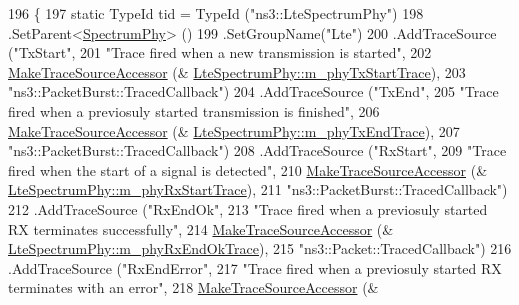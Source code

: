 \begin{DoxyCode}
196 \{
197   \textcolor{keyword}{static} TypeId tid = TypeId (\textcolor{stringliteral}{"ns3::LteSpectrumPhy"})
198     .SetParent<\hyperlink{classns3_1_1SpectrumPhy_a207bd7373a9fd3b7f8d8e00380a0e7e4}{SpectrumPhy}> ()
199     .SetGroupName(\textcolor{stringliteral}{"Lte"})
200     .AddTraceSource (\textcolor{stringliteral}{"TxStart"},
201                      \textcolor{stringliteral}{"Trace fired when a new transmission is started"},
202                      \hyperlink{group__tracing_gab21a770b9855af4e8f69f7531ea4a6b0}{MakeTraceSourceAccessor} (&
      \hyperlink{classns3_1_1LteSpectrumPhy_a51240ee46496b84e08f0e8101c74fcfc}{LteSpectrumPhy::m\_phyTxStartTrace}),
203                      \textcolor{stringliteral}{"ns3::PacketBurst::TracedCallback"})
204     .AddTraceSource (\textcolor{stringliteral}{"TxEnd"},
205                      \textcolor{stringliteral}{"Trace fired when a previosuly started transmission is finished"},
206                      \hyperlink{group__tracing_gab21a770b9855af4e8f69f7531ea4a6b0}{MakeTraceSourceAccessor} (&
      \hyperlink{classns3_1_1LteSpectrumPhy_a0c6aa04be77ea12d62acc1c71dcd2658}{LteSpectrumPhy::m\_phyTxEndTrace}),
207                      \textcolor{stringliteral}{"ns3::PacketBurst::TracedCallback"})
208     .AddTraceSource (\textcolor{stringliteral}{"RxStart"},
209                      \textcolor{stringliteral}{"Trace fired when the start of a signal is detected"},
210                      \hyperlink{group__tracing_gab21a770b9855af4e8f69f7531ea4a6b0}{MakeTraceSourceAccessor} (&
      \hyperlink{classns3_1_1LteSpectrumPhy_a78dd3511fa6cb1facf9d6ce1b0d1b5a1}{LteSpectrumPhy::m\_phyRxStartTrace}),
211                      \textcolor{stringliteral}{"ns3::PacketBurst::TracedCallback"})
212     .AddTraceSource (\textcolor{stringliteral}{"RxEndOk"},
213                      \textcolor{stringliteral}{"Trace fired when a previosuly started RX terminates successfully"},
214                      \hyperlink{group__tracing_gab21a770b9855af4e8f69f7531ea4a6b0}{MakeTraceSourceAccessor} (&
      \hyperlink{classns3_1_1LteSpectrumPhy_ae9cf15930fd70025ee8d649ecb2624c6}{LteSpectrumPhy::m\_phyRxEndOkTrace}),
215                      \textcolor{stringliteral}{"ns3::Packet::TracedCallback"})
216     .AddTraceSource (\textcolor{stringliteral}{"RxEndError"},
217                      \textcolor{stringliteral}{"Trace fired when a previosuly started RX terminates with an error"},
218                      \hyperlink{group__tracing_gab21a770b9855af4e8f69f7531ea4a6b0}{MakeTraceSourceAccessor} (&

\end{DoxyCode}
